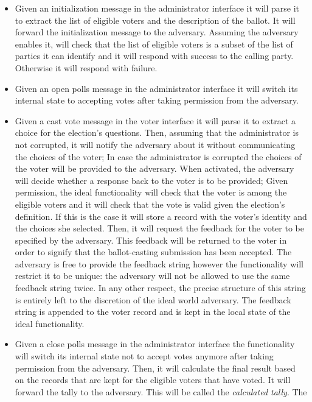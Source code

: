 \begin{itemize}
\item Given an initialization message in the administrator interface
  it will parse it to extract the list of eligible voters and the
  description of the ballot. It will forward the initialization
  message to the adversary. Assuming the adversary enables it, will
  check that the list of eligible voters is a subset of the list of
  parties it can identify and it will respond with success to the
  calling party. Otherwise it will respond with failure.
\item Given an open polls message in the administrator interface it
  will switch its internal state to accepting votes after taking
  permission from the adversary.
\item Given a cast vote message in the voter interface it will parse
  it to extract a choice for the election's questions. Then, assuming
  that the administrator is not corrupted, it will notify the
  adversary about it without communicating the choices of the voter;
  In case the administrator is corrupted the choices of the voter will
  be provided to the adversary. When activated, the adversary will
  decide whether a response back to the voter is to be provided; Given
  permission, the ideal functionality will check that the voter is
  among the eligible voters and it will check that the vote is valid
  given the election's definition. If this is the case it will store a
  record with the voter's identity and the choices she selected. Then,
  it will request the feedback for the voter to be specified by the
  adversary. This feedback will be returned to the voter in order to
  signify that the ballot-casting submission has been accepted. The
  adversary is free to provide the feedback string however the
  functionality will restrict it to be unique: the adversary will not
  be allowed to use the same feedback string twice. In any other
  respect, the precise structure of this string is entirely left to
  the discretion of the ideal world adversary. The feedback string is
  appended to the voter record and is kept in the local state of the
  ideal functionality.
\item Given a close polls message in the administrator interface the
  functionality will switch its internal state not to accept votes
  anymore after taking permission from the adversary.  Then, it will
  calculate the final result based on the records that are kept for
  the eligible voters that have voted. It will forward the tally to
  the adversary. This will be called the {\em calculated tally}. The

\end{itemize}

